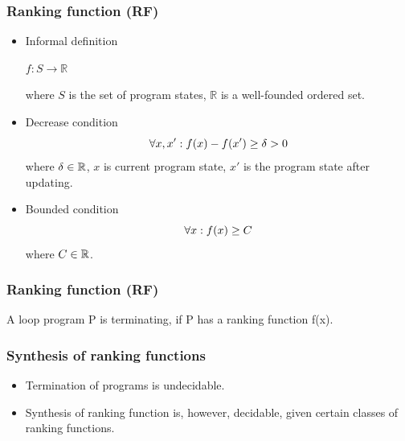 \begin{frame}
\frametitle{Ranking function (RF)}
\begin{itemize}
\item Informal definition \\
\begin{center}
$f: S \rightarrow \mathbb{R}$
\end{center}
where $S$ is the set of program states, $\mathbb{R}$ is a well-founded ordered set.
\item Decrease condition \\
\begin{equation}
\forall x, x': f(x)-f(x')\geq \delta >0 \notag
\end{equation}
where $\delta \in \mathbb{R}$, $x$ is current program state, $x'$ is the program state after updating.
\item Bounded condition \\
\begin{equation}
\forall x: f(x)\geq C \notag
\end{equation}
 where $C \in \mathbb{R}$.
\end{itemize}
\end{frame}

\begin{frame}
\frametitle{Ranking function (RF)}
\begin{myTheorem}
A loop program P is terminating, if P has a ranking function f(x).
\end{myTheorem}
\end{frame}


\begin{frame}
\frametitle{Synthesis of ranking functions}
\begin{itemize}
\item Termination of programs is undecidable.
\item Synthesis of ranking function is, however, decidable, given certain classes of ranking functions.
\end{itemize}
\end{frame}

